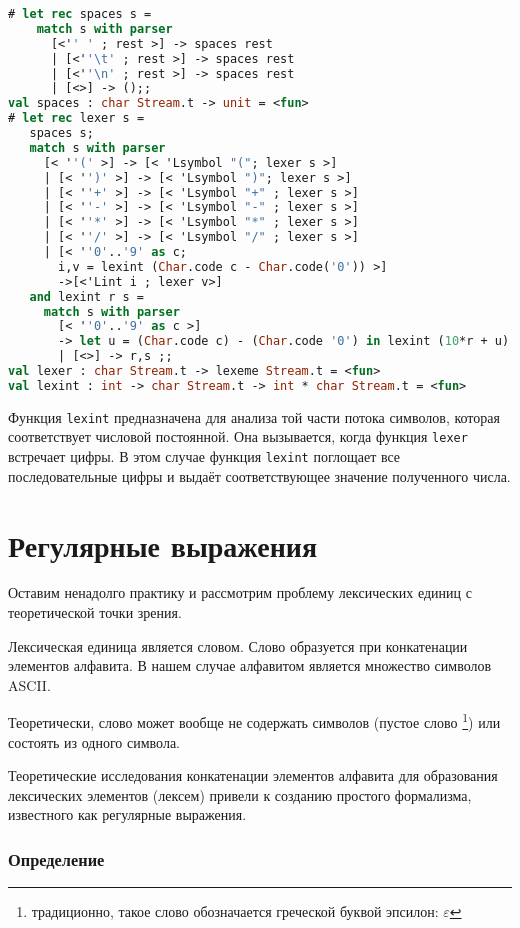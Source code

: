 \begin{lstlisting}[language=Caml]
# let rec spaces s =
    match s with parser
      [<'' ' ; rest >] -> spaces rest
      | [<''\t' ; rest >] -> spaces rest
      | [<''\n' ; rest >] -> spaces rest
      | [<>] -> ();;
val spaces : char Stream.t -> unit = <fun>
# let rec lexer s =
   spaces s;
   match s with parser
     [< ''(' >] -> [< 'Lsymbol "("; lexer s >]
     | [< '')' >] -> [< 'Lsymbol ")"; lexer s >]
     | [< ''+' >] -> [< 'Lsymbol "+" ; lexer s >]
     | [< ''-' >] -> [< 'Lsymbol "-" ; lexer s >]
     | [< ''*' >] -> [< 'Lsymbol "*" ; lexer s >]
     | [< ''/' >] -> [< 'Lsymbol "/" ; lexer s >]
     | [< ''0'..'9' as c;
       i,v = lexint (Char.code c - Char.code('0')) >]
       ->[<'Lint i ; lexer v>]
   and lexint r s =
     match s with parser
       [< ''0'..'9' as c >]
       -> let u = (Char.code c) - (Char.code '0') in lexint (10*r + u) s
       | [<>] -> r,s ;;
val lexer : char Stream.t -> lexeme Stream.t = <fun>
val lexint : int -> char Stream.t -> int * char Stream.t = <fun>
\end{lstlisting}

Функция \texttt{lexint} предназначена для анализа той части потока символов,
которая соответствует числовой постоянной. Она вызывается, когда функция
\texttt{lexer} встречает цифры. В этом случае функция \texttt{lexint} поглощает
все последовательные цифры и выдаёт соответствующее значение полученного числа.

\section{Регулярные выражения}

Оставим ненадолго практику и рассмотрим проблему лексических единиц с
теоретической точки зрения.

Лексическая единица является словом. Слово образуется при конкатенации элементов
алфавита. В нашем случае алфавитом является множество символов ASCII.

Теоретически, слово может вообще не содержать символов (пустое слово
\footnote{традиционно, такое слово обозначается греческой буквой эпсилон:
$\varepsilon$}) или состоять из одного символа.

Теоретические исследования конкатенации элементов алфавита для образования
лексических элементов (лексем) привели к созданию простого формализма,
известного как регулярные выражения.

\subsubsection{Определение}

